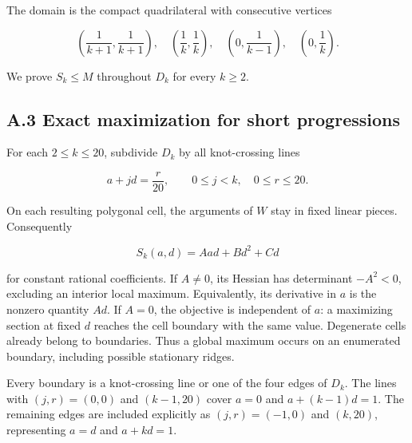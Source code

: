 \documentclass[11pt,a4paper]{article}
\begin{document}
\begin{samepage}

The domain is the compact quadrilateral with consecutive vertices

\[
\left(\frac1{k+1},\frac1{k+1}\right),\quad
\left(\frac1k,\frac1k\right),\quad
\left(0,\frac1{k-1}\right),\quad
\left(0,\frac1k\right).
\]

\end{samepage}

We prove \(S_k\le M\) throughout \(D_k\) for every \(k\ge2\).


\hypertarget{a.3-exact-maximization-for-short-progressions}{%
\subsection{A.3 Exact maximization for short
progressions}\label{a.3-exact-maximization-for-short-progressions}}

\begin{samepage}

For each \(2\le k\le20\), subdivide \(D_k\) by all knot-crossing lines

\[a+jd=\frac r{20},\qquad 0\le j<k,\quad 0\le r\le20.\]

\end{samepage}

\begin{samepage}

On each resulting polygonal cell, the arguments of \(W\) stay in fixed
linear pieces. Consequently

\[S_k(a,d)=Aad+Bd^2+Cd\]

\end{samepage}

for constant rational coefficients. If \(A\ne0\), its Hessian has
determinant \(-A^2<0\), excluding an interior local maximum.
Equivalently, its derivative in \(a\) is the nonzero quantity \(Ad\). If
\(A=0\), the objective is independent of \(a\): a maximizing section at
fixed \(d\) reaches the cell boundary with the same value. Degenerate
cells already belong to boundaries. Thus a global maximum occurs on an
enumerated boundary, including possible stationary ridges.

Every boundary is a knot-crossing line or one of the four edges of
\(D_k\). The lines with \((j,r)=(0,0)\) and \((k-1,20)\) cover \(a=0\)
and \(a+(k-1)d=1\). The remaining edges are included explicitly as
\((j,r)=(-1,0)\) and \((k,20)\), representing \(a=d\) and \(a+kd=1\).
\end{document}
